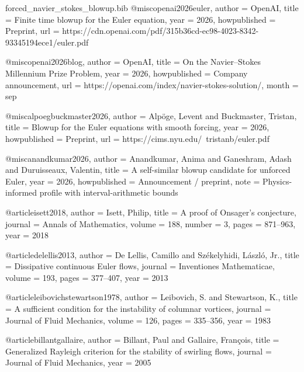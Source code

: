 \begin{filecontents*}{forced_navier_stokes_blowup.bib}
@misc{openai2026euler,
  author       = {{OpenAI}},
  title        = {Finite time blowup for the {E}uler equation},
  year         = {2026},
  howpublished = {Preprint},
  url          = {https://cdn.openai.com/pdf/315b36cd-ec98-4023-8342-93345194ece1/euler.pdf}
}

@misc{openai2026blog,
  author       = {{OpenAI}},
  title        = {On the {N}avier--{S}tokes {M}illennium {P}rize {P}roblem},
  year         = {2026},
  howpublished = {Company announcement},
  url          = {https://openai.com/index/navier-stokes-solution/},
  month        = sep
}

@misc{alpoegbuckmaster2026,
  author       = {Alp{\"o}ge, Levent and Buckmaster, Tristan},
  title        = {Blowup for the {E}uler equations with smooth forcing},
  year         = {2026},
  howpublished = {Preprint},
  url          = {https://cims.nyu.edu/~tristanb/euler.pdf}
}

@misc{anandkumar2026,
  author       = {Anandkumar, Anima and Ganeshram, Adash and Duruisseaux, Valentin},
  title        = {A self-similar blowup candidate for unforced {E}uler},
  year         = {2026},
  howpublished = {Announcement / preprint},
  note         = {Physics-informed profile with interval-arithmetic bounds}
}

@article{isett2018,
  author  = {Isett, Philip},
  title   = {A proof of {O}nsager's conjecture},
  journal = {Annals of Mathematics},
  volume  = {188},
  number  = {3},
  pages   = {871--963},
  year    = {2018}
}

@article{delellis2013,
  author  = {De Lellis, Camillo and Sz{\'e}kelyhidi, L{\'a}szl{\'o}, Jr.},
  title   = {Dissipative continuous {E}uler flows},
  journal = {Inventiones Mathematicae},
  volume  = {193},
  pages   = {377--407},
  year    = {2013}
}

@article{leibovichstewartson1978,
  author  = {Leibovich, S. and Stewartson, K.},
  title   = {A sufficient condition for the instability of columnar vortices},
  journal = {Journal of Fluid Mechanics},
  volume  = {126},
  pages   = {335--356},
  year    = {1983}
}

@article{billantgallaire,
  author  = {Billant, Paul and Gallaire, Fran{\c{c}}ois},
  title   = {Generalized {R}ayleigh criterion for the stability of swirling flows},
  journal = {Journal of Fluid Mechanics},
  year    = {2005}
}
\end{filecontents*}

\documentclass[11pt,a4paper]{amsart}

\usepackage[T1]{fontenc}
\usepackage[utf8]{inputenc}
\usepackage{lmodern}
\usepackage{microtype}
\usepackage{mathtools}
\usepackage{amssymb,amsthm,amsmath}
\usepackage{enumitem}
\usepackage{booktabs}
\usepackage{array}
\usepackage{bm}
\usepackage{tikz}
\usetikzlibrary{arrows.meta,positioning,calc,decorations.pathreplacing,patterns}
\usepackage[hidelinks]{hyperref}
\usepackage{xurl}
\usepackage[numbers,sort&compress]{natbib}
\usepackage{xcolor}

